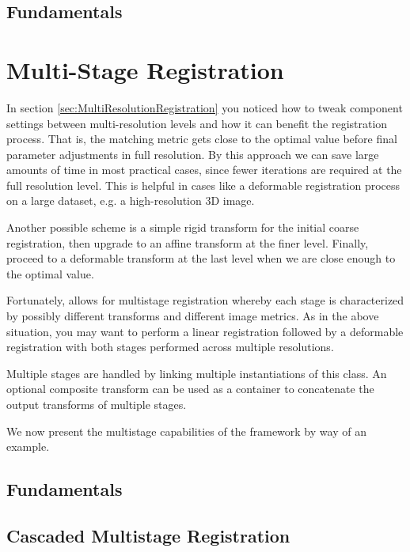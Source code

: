 \subsection{Fundamentals}
\ifitkFullVersion

\fi

\section{Multi-Stage Registration}
\label{sec:MultiStageRegistration}
In section \ref{sec:MultiResolutionRegistration} you noticed how to tweak
component settings between multi-resolution levels and how it can benefit the
registration process. That is, the matching metric gets close to the optimal
value before final parameter adjustments in full resolution.
By this approach we can save large amounts of time in most practical
cases, since fewer iterations are required at the full resolution level.
This is helpful in cases like a deformable registration process on a large
dataset, e.g. a high-resolution 3D image.

Another possible scheme is a simple rigid transform for the initial coarse
registration, then upgrade to an affine transform at the finer level. Finally,
proceed to a deformable transform at the last level when we are close enough to
the optimal value.

Fortunately,  allows for multistage registration
whereby each stage is characterized by possibly different transforms and different
image metrics. As in the above situation, you may want to perform a linear registration
followed by a deformable registration with both stages performed across multiple
resolutions.

Multiple stages are handled by linking multiple instantiations of this class.
An optional composite transform can be used as a container to concatenate
the output transforms of multiple stages.

We now present the multistage capabilities of the framework by way of an example.

\subsection{Fundamentals}
\ifitkFullVersion

\fi

\subsection{Cascaded Multistage Registration}
\ifitkFullVersion

\fi

